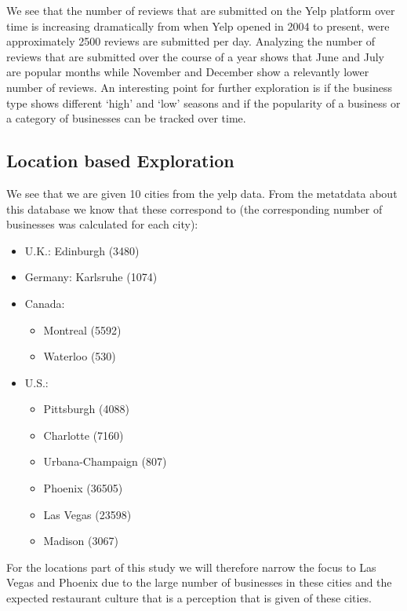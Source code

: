 \documentclass[11pt]{article}
\begin{document}
We see that the number of reviews that are submitted on the Yelp platform over time is increasing dramatically from when Yelp opened in 2004 to present, were approximately 2500 reviews are submitted per day. Analyzing the number of reviews that are submitted over the course of a year shows that June and July are popular months while November and December show a relevantly lower number of reviews. An interesting point for further exploration is if the business type shows different `high' and `low' seasons and if the popularity of a business or a category of businesses can be tracked over time.

\subsection*{Location based Exploration}

We see that we are given 10 cities from the yelp data. From the metatdata about this database we know that these correspond to (the corresponding number of businesses was calculated for each city):
\begin{itemize}
	\item U.K.: Edinburgh (3480)
	\item Germany: Karlsruhe (1074)
	\item Canada:
		\begin{itemize}
			\item Montreal (5592)
			\item Waterloo (530)
		\end{itemize}
	\item U.S.:
		\begin{itemize}
			\item Pittsburgh (4088)
			\item Charlotte (7160)
			\item Urbana-Champaign (807)
			\item Phoenix (36505)
			\item Las Vegas (23598)
			\item Madison (3067)
		\end{itemize}
\end{itemize}

For the locations part of this study we will therefore narrow the focus to Las Vegas and Phoenix due to the large number of businesses in these cities and the expected restaurant culture that is a perception that is given of these cities.\\
\end{document}
